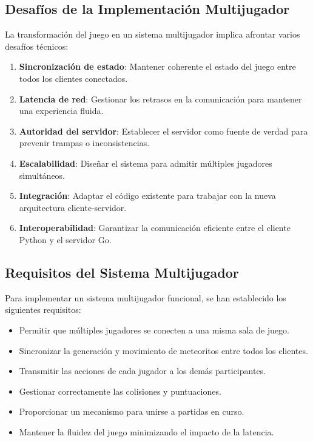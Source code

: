 \documentclass[12pt,letterpaper]{article}
\begin{document}
\subsection{Desafíos de la Implementación Multijugador}

La transformación del juego en un sistema multijugador implica afrontar varios desafíos técnicos:

\begin{enumerate}
    \item \textbf{Sincronización de estado}: Mantener coherente el estado del juego entre todos los clientes conectados.
    \item \textbf{Latencia de red}: Gestionar los retrasos en la comunicación para mantener una experiencia fluida.
    \item \textbf{Autoridad del servidor}: Establecer el servidor como fuente de verdad para prevenir trampas o inconsistencias.
    \item \textbf{Escalabilidad}: Diseñar el sistema para admitir múltiples jugadores simultáneos.
    \item \textbf{Integración}: Adaptar el código existente para trabajar con la nueva arquitectura cliente-servidor.
    \item \textbf{Interoperabilidad}: Garantizar la comunicación eficiente entre el cliente Python y el servidor Go.
\end{enumerate}

\subsection{Requisitos del Sistema Multijugador}

Para implementar un sistema multijugador funcional, se han establecido los siguientes requisitos:

\begin{itemize}
    \item Permitir que múltiples jugadores se conecten a una misma sala de juego.
    \item Sincronizar la generación y movimiento de meteoritos entre todos los clientes.
    \item Transmitir las acciones de cada jugador a los demás participantes.
    \item Gestionar correctamente las colisiones y puntuaciones.
    \item Proporcionar un mecanismo para unirse a partidas en curso.
    \item Mantener la fluidez del juego minimizando el impacto de la latencia.
\end{itemize}
\end{document}
